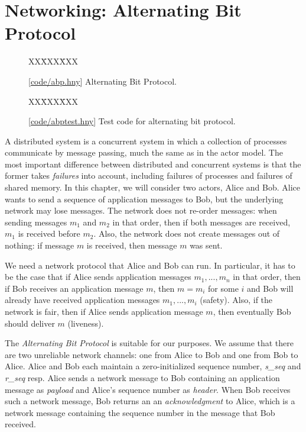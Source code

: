 \documentclass{report}
\newcommand{\harmonysource}[1]{
\begin{tabbing}
XX\=XXX\=XXX\kill
    
\end{tabbing}
}
\newcommand{\harmonylink}[1]{%
[\href{https://www.cs.cornell.edu/home/rvr/harmony/#1}{\underline{#1}}]%
}
\newenvironment{code}{
\tcolorbox
}{
\endtcolorbox
}
\begin{document}
\chapter{Networking: Alternating Bit Protocol}
\label{ch:abp}
%
%
%

\begin{figure}
\begin{code}
\harmonysource{abp}
\end{code}
\caption{\harmonylink{code/abp.hny} Alternating Bit Protocol.}
\label{fig:abp}
\end{figure}

\begin{figure}
\begin{code}
\harmonysource{abptest}
\end{code}
\caption{\harmonylink{code/abptest.hny} Test code for alternating bit protocol.}
\label{fig:abptest}
\end{figure}

A distributed system is a concurrent system in which a collection
of processes communicate by message passing, much the same as
in the actor model.
The most important difference between distributed and concurrent
systems is that the former takes \emph{failures}
%
into account,
including failures of processes and failures of shared memory.
In this chapter, we will consider two actors, Alice and Bob.
Alice wants to send a sequence of application messages to Bob,
but the underlying network may lose messages.
%
The network does not re-order messages: when sending messages
$m_1$ and $m_2$ in that order, then if both messages are received,
$m_1$ is received before $m_2$.
Also, the network does not create messages out of nothing: if
message $m$ is received, then message $m$ was sent.

We need a network protocol that Alice and Bob can run.
In particular, it has to be the case that if Alice sends application
messages $m_1, ..., m_n$ in that order, then if Bob receives an
application message
$m$, then $m = m_i$ for some $i$ and Bob will already have received
application messages $m_1, ..., m_i$ (safety).
Also, if the network is fair, then if Alice sends application message
$m$, then eventually Bob should deliver $m$ (liveness).

The \emph{Alternating Bit Protocol} is suitable for our purposes.
We assume that there are two unreliable network channels: one from Alice
to Bob and one from Bob to Alice.
Alice and Bob each maintain a zero-initialized sequence number,
\textit{s\_seq} and \textit{r\_seq} resp.
Alice sends a network message to Bob containing an
application message as \emph{payload} and Alice's sequence number
as \emph{header}.
When Bob receives such a network message, Bob returns an
an \emph{acknowledgment} to Alice, which is a network message
containing the sequence number in the message that Bob received.
\end{document}
